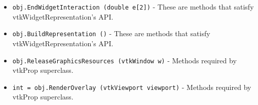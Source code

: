 \begin{itemize}
\item  \verb|obj.EndWidgetInteraction (double e[2])| -  These are methods that satisfy vtkWidgetRepresentation's API.

\item  \verb|obj.BuildRepresentation ()| -  These are methods that satisfy vtkWidgetRepresentation's API.

\item  \verb|obj.ReleaseGraphicsResources (vtkWindow w)| -  Methods required by vtkProp superclass.

\item  \verb|int = obj.RenderOverlay (vtkViewport viewport)| -  Methods required by vtkProp superclass.

\end{itemize}
